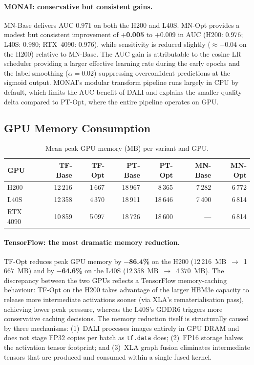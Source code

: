 \paragraph{MONAI: conservative but consistent gains.}
MN-Base delivers AUC $0.971$ on both the H200 and L40S.  MN-Opt
provides a modest but consistent improvement of \textbf{$+$0.005} to
$+$0.009 in AUC (H200: $0.976$; L40S: $0.980$; RTX~4090: $0.976$),
while sensitivity is reduced slightly ($\approx -0.04$ on the H200)
relative to MN-Base.  The AUC gain is attributable to the cosine LR
scheduler providing a larger effective learning rate during the early
epochs and the label smoothing ($\alpha = 0.02$) suppressing
overconfident predictions at the sigmoid output.  MONAI's modular
transform pipeline runs largely in CPU by default, which limits the
AUC benefit of DALI and explains the smaller quality delta compared to
PT-Opt, where the entire pipeline operates on GPU.

\subsection{GPU Memory Consumption}
\label{subsec:memory}

\begin{table}[h]
  \centering
  \caption{Mean peak GPU memory (MB) per variant and GPU.}
  \label{tab:mem_summary}
  \begin{tabular}{lrrrrrr}
    \hline
    \textbf{GPU} & \textbf{TF-Base} & \textbf{TF-Opt} & \textbf{PT-Base} & \textbf{PT-Opt} & \textbf{MN-Base} & \textbf{MN-Opt} \\
    \hline
    H200    & 12\,216 & 1\,667 & 18\,967 & 8\,365 & 7\,282 & 6\,772 \\
    L40S    & 12\,358 & 4\,370 & 18\,911 & 18\,646 & 7\,400 & 6\,814 \\
    RTX 4090 & 10\,859 & 5\,097 & 18\,726 & 18\,600 &   ---  & 6\,814 \\
    \hline
  \end{tabular}
\end{table}

\paragraph{TensorFlow: the most dramatic memory reduction.}
TF-Opt reduces peak GPU memory by \textbf{$-$86.4\%} on the H200
(12\,216~MB~$\to$~1\,667~MB) and by \textbf{$-$64.6\%} on the L40S
(12\,358~MB~$\to$~4\,370~MB).  The discrepancy between the two GPUs
reflects a TensorFlow memory-caching behaviour: TF-Opt on the H200
takes advantage of the larger HBM3e capacity to release more
intermediate activations sooner (via XLA's rematerialisation pass),
achieving lower peak pressure, whereas the L40S's GDDR6 triggers more
conservative caching decisions.  The memory reduction itself is
structurally caused by three mechanisms: (1)~DALI processes images
entirely in GPU DRAM and does not stage FP32 copies per batch as
\texttt{tf.data} does; (2)~FP16 storage halves the activation tensor
footprint; and (3)~XLA graph fusion eliminates intermediate tensors
that are produced and consumed within a single fused kernel.

